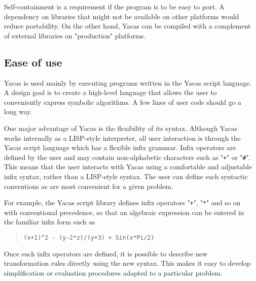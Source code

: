 \documentclass{llncs}
\begin{document}
Self-containment is a requirement if the program is to be easy to port. A
dependency on libraries that might not be available on other platforms would
reduce portability. On the other hand, Yacas can be compiled with a complement
of external libraries on "production" platforms.


\subsection*{Ease of use}
Yacas is used mainly by executing programs written in the Yacas script
language. A design goal is to create a high-level language that allows the user
to conveniently express symbolic algorithms. A few lines of user code should go
a long way.


One major advantage of Yacas is the flexibility of its syntax. Although Yacas
works internally as a LISP-style interpreter, all user interaction is through
the Yacas script language which has a flexible infix grammar. Infix operators
are defined by the user and may contain non-alphabetic characters such as "\texttt{+}"
or "\verb|#|". This means that the user interacts with Yacas using a comfortable and adjustable infix syntax,
rather than a LISP-style syntax. The user can define such syntactic
conventions as are most convenient for a given problem.


For example, the Yacas script library defines infix operators "\texttt{+}", "\texttt{*}" and so
on with conventional precedence, so that an algebraic expression can be entered
in the familiar infix form such as


\begin{quote}\small\begin{verbatim}
(x+1)^2 - (y-2*z)/(y+3) + Sin(x*Pi/2)
\end{verbatim}\end{quote}


Once such infix operators are defined, it is possible to describe new
transformation rules directly using the new syntax. This makes it easy to
develop simplification or evaluation procedures adapted to a particular
problem.
\end{document}
